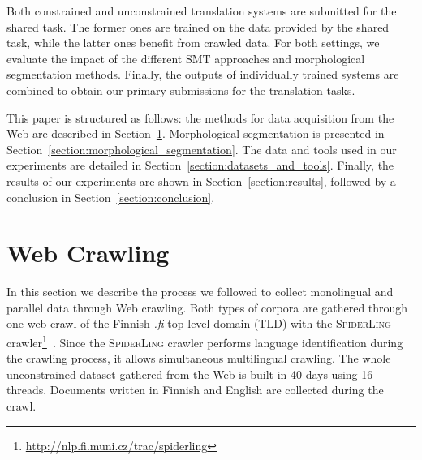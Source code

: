\documentclass[postprint]{flammie}
\begin{document}
Both constrained and unconstrained translation systems are submitted for the shared task. The former ones are trained on the data provided by the shared task, while the latter ones benefit from crawled data. For both settings, we evaluate the impact of the different SMT approaches and morphological segmentation methods. Finally, the outputs of individually trained systems are combined to obtain our primary submissions for the translation tasks.
%

This paper is structured as follows: the methods for data acquisition from the Web are described in Section~\ref{section:web_crawling}. Morphological segmentation is presented in Section~\ref{section:morphological_segmentation}. The data and tools used in our experiments are detailed in Section~\ref{section:datasets_and_tools}. Finally, the results of our experiments are shown in Section~\ref{section:results}, followed by a conclusion in Section~\ref{section:conclusion}.
%
\section{Web Crawling}
\label{section:web_crawling}

In this section we describe the process we followed to collect monolingual and parallel data through Web crawling. Both types of corpora are gathered through one web crawl of the Finnish \emph{.fi} top-level domain (TLD) with the \textsc{SpiderLing} crawler\footnote{\url{http://nlp.fi.muni.cz/trac/spiderling}}~\cite{suchomel2012efficient}. Since the \textsc{SpiderLing} crawler performs language identification during the crawling process, it allows simultaneous multilingual crawling. The whole unconstrained dataset gathered from the Web is built in 40 days using 16 threads. Documents written in Finnish and English are collected during the crawl.
\end{document}
